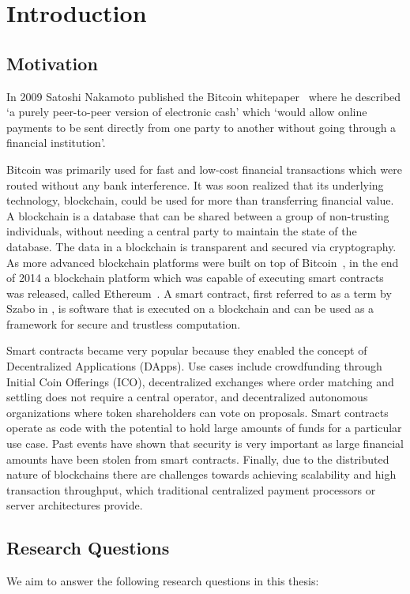 \chapter{Introduction}

\section{Motivation}
In 2009 Satoshi Nakamoto published the Bitcoin whitepaper~\cite{bitcoin} where he described `a purely peer-to-peer version of electronic cash' which `would allow online payments to be sent directly from one party to another without going through a financial institution'. 

Bitcoin was primarily used for fast and low-cost financial transactions which were routed without any bank interference. It was soon realized that its underlying technology, blockchain, could be used for more than transferring financial value. A blockchain is a database that can be shared between a group of non-trusting individuals, without needing a central party to maintain the state of the database. The data in a blockchain is transparent and secured via cryptography. As more advanced blockchain platforms were built on top of Bitcoin~\cite{colored}, in the end of 2014 a blockchain platform which was capable of executing smart contracts was released, called Ethereum~\cite{vitalik}. A smart contract, first referred to as a term by Szabo in \cite{szabo}, is software that is executed on a blockchain and can be used as a framework for secure and trustless computation. 

Smart contracts became very popular because they enabled the concept of Decentralized Applications (DApps). Use cases include crowdfunding through Initial Coin Offerings (ICO), decentralized exchanges where order matching and settling does not require a central operator, and decentralized autonomous organizations where token shareholders can vote on proposals. Smart contracts operate as code with the potential to hold large amounts of funds for a particular use case. Past events have shown that security is very important as large financial amounts have been stolen from smart contracts. Finally, due to the distributed nature of blockchains there are challenges towards achieving scalability and high transaction throughput, which traditional centralized payment processors or server architectures provide. 

\section{Research Questions}
We aim to answer the following research questions in this thesis:

